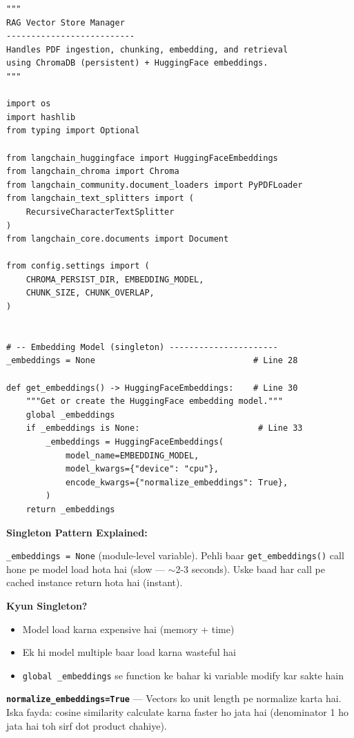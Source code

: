 \documentclass[12pt, a4paper]{article}
\begin{document}
\begin{lstlisting}[style=pythonstyle, title={\color{accentgreen}\faIcon{file} rag/vector\_store.py --- Key Functions}]
"""
RAG Vector Store Manager
--------------------------
Handles PDF ingestion, chunking, embedding, and retrieval
using ChromaDB (persistent) + HuggingFace embeddings.
"""

import os
import hashlib
from typing import Optional

from langchain_huggingface import HuggingFaceEmbeddings
from langchain_chroma import Chroma
from langchain_community.document_loaders import PyPDFLoader
from langchain_text_splitters import (
    RecursiveCharacterTextSplitter
)
from langchain_core.documents import Document

from config.settings import (
    CHROMA_PERSIST_DIR, EMBEDDING_MODEL,
    CHUNK_SIZE, CHUNK_OVERLAP,
)


# -- Embedding Model (singleton) ----------------------
_embeddings = None                                # Line 28

def get_embeddings() -> HuggingFaceEmbeddings:    # Line 30
    """Get or create the HuggingFace embedding model."""
    global _embeddings
    if _embeddings is None:                        # Line 33
        _embeddings = HuggingFaceEmbeddings(
            model_name=EMBEDDING_MODEL,
            model_kwargs={"device": "cpu"},
            encode_kwargs={"normalize_embeddings": True},
        )
    return _embeddings
\end{lstlisting}

\begin{codestorybox}
\textbf{Singleton Pattern Explained:}

\texttt{\_embeddings = None} (module-level variable). Pehli baar \texttt{get\_embeddings()} call hone pe model load hota hai (slow --- $\sim$2-3 seconds). Uske baad har call pe cached instance return hota hai (instant).

\textbf{Kyun Singleton?}
\begin{itemize}
\item Model load karna expensive hai (memory + time)
\item Ek hi model multiple baar load karna wasteful hai
\item \texttt{global \_embeddings} se function ke bahar ki variable modify kar sakte hain
\end{itemize}

\textbf{\texttt{normalize\_embeddings=True}} --- Vectors ko unit length pe normalize karta hai. Iska fayda: cosine similarity calculate karna faster ho jata hai (denominator 1 ho jata hai toh sirf dot product chahiye).
\end{codestorybox}
\end{document}
